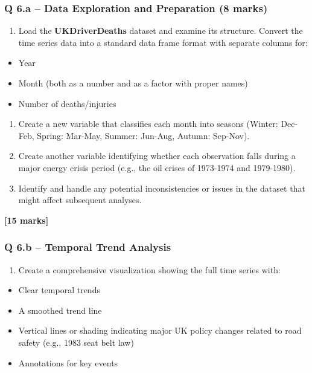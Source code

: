 \documentclass[
  10t,
]{article}
\providecommand{\tightlist}{%
  \setlength{\itemsep}{0pt}\setlength{\parskip}{0pt}}\usepackage{longtable,booktabs,array}
\begin{document}
\subsubsection{Q 6.a -- Data Exploration and Preparation (8
marks)}\label{q-6.a-data-exploration-and-preparation-8-marks}

\begin{enumerate}
\def\labelenumi{\roman{enumi}.}
\tightlist
\item
  Load the \textbf{UKDriverDeaths} dataset and examine its structure.
  Convert the time series data into a standard data frame format with
  separate columns for:
\end{enumerate}

\begin{itemize}
\tightlist
\item
  Year
\item
  Month (both as a number and as a factor with proper names)
\item
  Number of deaths/injuries
\end{itemize}

\begin{enumerate}
\def\labelenumi{\roman{enumi}.}
\setcounter{enumi}{1}
\tightlist
\item
  Create a new variable that classifies each month into seasons (Winter:
  Dec-Feb, Spring: Mar-May, Summer: Jun-Aug, Autumn: Sep-Nov).
\item
  Create another variable identifying whether each observation falls
  during a major energy crisis period (e.g., the oil crises of 1973-1974
  and 1979-1980).
\item
  Identify and handle any potential inconsistencies or issues in the
  dataset that might affect subsequent analyses.
\end{enumerate}

\textbf{{[}15 marks{]}}

\subsubsection{Q 6.b -- Temporal Trend
Analysis}\label{q-6.b-temporal-trend-analysis}

\begin{enumerate}
\def\labelenumi{\roman{enumi}.}
\tightlist
\item
  Create a comprehensive visualization showing the full time series
  with:
\end{enumerate}

\begin{itemize}
\tightlist
\item
  Clear temporal trends
\item
  A smoothed trend line
\item
  Vertical lines or shading indicating major UK policy changes related
  to road safety (e.g., 1983 seat belt law)
\item
  Annotations for key events
\end{itemize}
\end{document}
